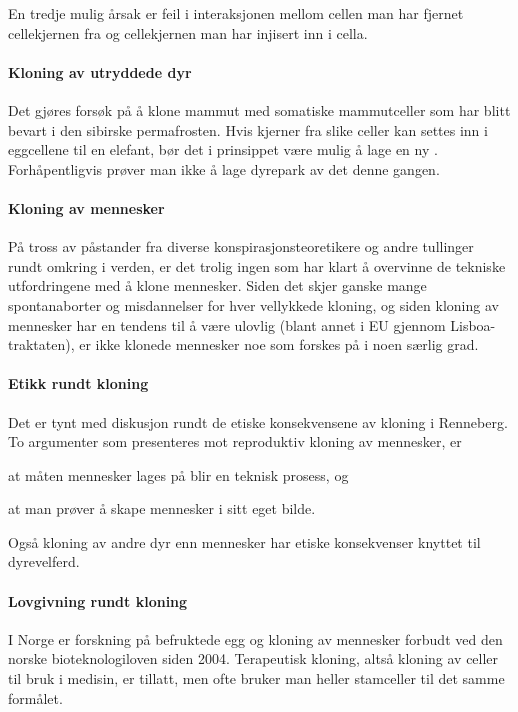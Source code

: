 En tredje mulig årsak er feil i interaksjonen mellom cellen man har fjernet cellekjernen fra og cellekjernen man har injisert inn i cella.

\paragraph{Kloning av utryddede dyr} Det gjøres forsøk på å klone mammut med somatiske mammutceller som har blitt bevart i den sibirske permafrosten. Hvis kjerner fra slike celler kan settes inn i eggcellene til en elefant, bør det i prinsippet være mulig å lage en ny . Forhåpentligvis prøver man ikke å lage dyrepark av det denne gangen.

\paragraph{Kloning av mennesker} På tross av påstander fra diverse konspirasjonsteoretikere og andre tullinger rundt omkring i verden, er det trolig ingen som har klart å overvinne de tekniske utfordringene med å klone mennesker. Siden det skjer ganske mange spontanaborter og misdannelser for hver vellykkede kloning, og siden kloning av mennesker har en tendens til å være ulovlig (blant annet i EU gjennom Lisboa-traktaten), er ikke klonede mennesker noe som forskes på i noen særlig grad.

\paragraph{Etikk rundt kloning} Det er tynt med diskusjon rundt de etiske konsekvensene av kloning i Renneberg. To argumenter som presenteres mot reproduktiv kloning av mennesker, er 
\begin{inparaenum}[(i)]
	\item at måten mennesker lages på blir en teknisk prosess, og 
	\item at man prøver å skape mennesker i sitt eget bilde.
\end{inparaenum}

Også kloning av andre dyr enn mennesker har etiske konsekvenser knyttet til dyrevelferd.

\paragraph{Lovgivning rundt kloning} I Norge er forskning på befruktede egg og kloning av mennesker forbudt ved den norske bioteknologiloven siden 2004. Terapeutisk kloning, altså kloning av celler til bruk i medisin, er tillatt, men ofte bruker man heller stamceller til det samme formålet.

